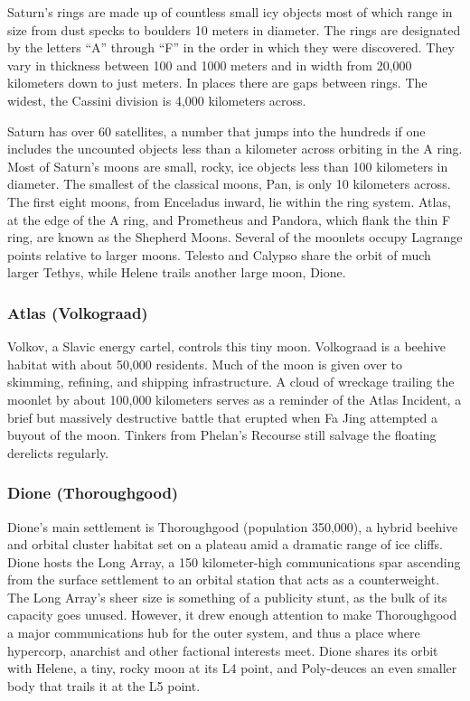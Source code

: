 Saturn's rings are made up of countless small icy objects
most of which range in size from dust specks to
boulders 10 meters in diameter. The rings are designated
by the letters ``A'' through ``F'' in the order in
which they were discovered. They vary in thickness 
between 100 and 1000 meters and in width from 
20,000 kilometers down to just meters. In places there 
are gaps between rings. The widest, the Cassini division
is 4,000 kilometers across.

Saturn has over 60 satellites, a number 
that jumps into the hundreds if one includes
the uncounted objects less than a
kilometer across orbiting in the A ring. 
Most of Saturn's moons are small, rocky, 
ice objects less than 100 kilometers in 
diameter. The smallest of the classical 
moons, Pan, is only 10 kilometers across. 
The first eight moons, from Enceladus 
inward, lie within the ring system. Atlas, 
at the edge of the A ring, and Prometheus 
and Pandora, which flank the thin F 
ring, are known as the Shepherd Moons. 
Several of the moonlets occupy Lagrange 
points relative to larger moons. Telesto 
and Calypso share the orbit of much 
larger Tethys, while Helene trails another 
large moon, Dione.

\subsubsection{Atlas (Volkograad)}

Volkov, a Slavic energy cartel, controls this 
tiny moon. Volkograad is a beehive habitat 
with about 50,000 residents. Much of the 
moon is given over to skimming, refining, 
and shipping infrastructure. A cloud of 
wreckage trailing the moonlet by about 
100,000 kilometers serves as a reminder 
of the Atlas Incident, a brief but massively 
destructive battle that erupted when Fa 
Jing attempted a buyout of the moon. Tinkers
from Phelan's Recourse still salvage
the floating derelicts regularly.

\subsubsection{Dione (Thoroughgood)}

Dione's main settlement is Thoroughgood 
(population 350,000), a hybrid beehive 
and orbital cluster habitat set on a plateau 
amid a dramatic range of ice cliffs. Dione 
hosts the Long Array, a 150 kilometer-high
communications spar ascending
from the surface settlement to an orbital 
station that acts as a counterweight. The 
Long Array's sheer size is something of a 
publicity stunt, as the bulk of its capacity 
goes unused. However, it drew enough 
attention to make Thoroughgood a major 
communications hub for the outer system, 
and thus a place where hypercorp, anarchist
and other factional interests meet.
Dione shares its orbit with Helene, a tiny, 
rocky moon at its L4 point, and Poly-deuces
an even smaller body that trails it
at the L5 point.

